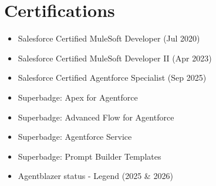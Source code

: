 \documentclass[11pt,a4paper]{article}
\begin{document}
\section{Certifications}
\begin{itemize}
  \item Salesforce Certified MuleSoft Developer (Jul 2020)
  \item Salesforce Certified MuleSoft Developer II (Apr 2023)
  \item Salesforce Certified Agentforce Specialist (Sep 2025)
  \item Superbadge: Apex for Agentforce
  \item Superbadge: Advanced Flow for Agentforce
  \item Superbadge: Agentforce Service
  \item Superbadge: Prompt Builder Templates
  \item Agentblazer status - Legend (2025 \& 2026)
\end{itemize}
\end{document}
